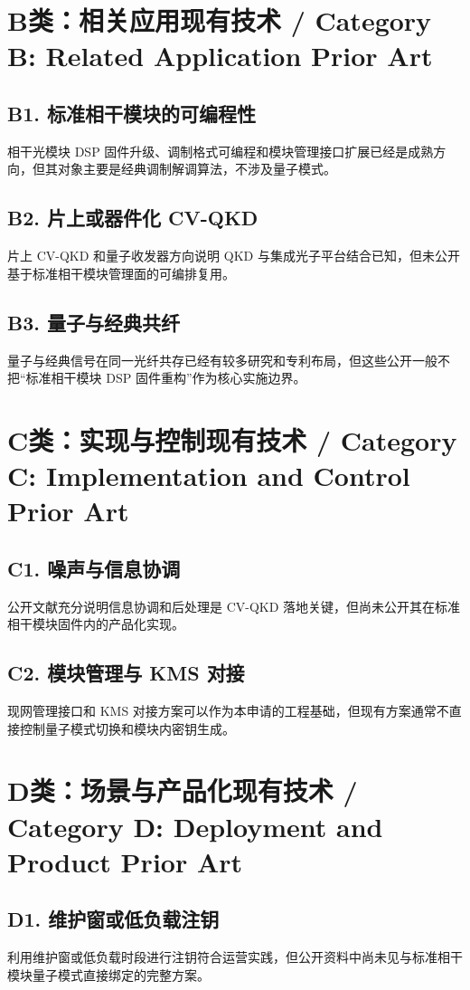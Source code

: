 ﻿\documentclass[12pt,a4paper]{article}
\begin{document}
\section{B类：相关应用现有技术 / Category B: Related Application Prior Art}
\subsection{B1. 标准相干模块的可编程性}
相干光模块 DSP 固件升级、调制格式可编程和模块管理接口扩展已经是成熟方向，但其对象主要是经典调制解调算法，不涉及量子模式。

\subsection{B2. 片上或器件化 CV-QKD}
片上 CV-QKD 和量子收发器方向说明 QKD 与集成光子平台结合已知，但未公开基于标准相干模块管理面的可编排复用。

\subsection{B3. 量子与经典共纤}
量子与经典信号在同一光纤共存已经有较多研究和专利布局，但这些公开一般不把“标准相干模块 DSP 固件重构”作为核心实施边界。

\section{C类：实现与控制现有技术 / Category C: Implementation and Control Prior Art}
\subsection{C1. 噪声与信息协调}
公开文献充分说明信息协调和后处理是 CV-QKD 落地关键，但尚未公开其在标准相干模块固件内的产品化实现。

\subsection{C2. 模块管理与 KMS 对接}
现网管理接口和 KMS 对接方案可以作为本申请的工程基础，但现有方案通常不直接控制量子模式切换和模块内密钥生成。

\section{D类：场景与产品化现有技术 / Category D: Deployment and Product Prior Art}
\subsection{D1. 维护窗或低负载注钥}
利用维护窗或低负载时段进行注钥符合运营实践，但公开资料中尚未见与标准相干模块量子模式直接绑定的完整方案。
\end{document}
